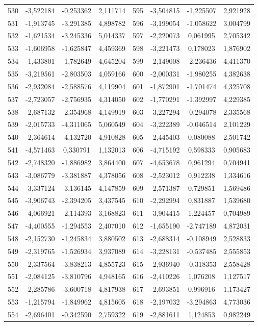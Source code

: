 \begin{apendicesenv}
\begin{table}[H]
\begin{tabular}{c c c c c c c c}
		530 & -3,522184 & -0,253362 & 2,111714 & 595 & -3,504815 & -1,225507 & 2,921928 \\
		531 & -1,913745 & -3,291385 & 4,898782 & 596 & -3,199054 & -1,058622 & 3,004799 \\
		532 & -1,621534 & -3,245336 & 5,014337 & 597 & -2,220073 & 0,061995 & 2,705342 \\
		533 & -1,606958 & -1,625847 & 4,459369 & 598 & -3,221473 & 0,178023 & 1,876902 \\
		534 & -1,433801 & -1,782649 & 4,645204 & 599 & -2,149008 & -2,236436 & 4,411370 \\
		535 & -3,219561 & -2,803503 & 4,059166 & 600 & -2,000331 & -1,980255 & 4,382638 \\
		536 & -2,932084 & -2,588576 & 4,119904 & 601 & -1,872901 & -1,701474 & 4,325708 \\
		537 & -2,723057 & -2,756935 & 4,314050 & 602 & -1,770291 & -1,392997 & 4,229385 \\
		538 & -2,687132 & -2,354968 & 4,149919 & 603 & -3,227294 & -0,294078 & 2,335568 \\
		539 & -2,015733 & -4,311065 & 5,060549 & 604 & -3,222389 & -0,046514 & 2,101229 \\
		540 & -2,364614 & -4,132720 & 4,910828 & 605 & -2,445403 & 0,080088 & 2,501742 \\
		541 & -4,571463 & 0,330791 & 1,132013 & 606 & -4,715192 & 0,598333 & 0,905683 \\
		542 & -2,748320 & -1,886982 & 3,864400 & 607 & -4,653678 & 0,961294 & 0,704941 \\
		543 & -3,086779 & -3,381887 & 4,378056 & 608 & -2,523012 & 0,912238 & 1,334616 \\
		544 & -3,337124 & -3,136145 & 4,147859 & 609 & -2,571387 & 0,729851 & 1,569486 \\
		545 & -3,906743 & -2,394205 & 3,437545 & 610 & -2,292994 & 0,831887 & 1,539680 \\
		546 & -4,066921 & -2,114393 & 3,168823 & 611 & -3,904415 & 1,224457 & 0,704989 \\
		547 & -4,400555 & -1,294553 & 2,407010 & 612 & -1,655190 & -2,747189 & 4,872031 \\
		548 & -2,152730 & -1,245834 & 3,880502 & 613 & -2,688314 & -0,108949 & 2,528833 \\
		549 & -2,319765 & -1,526934 & 3,937089 & 614 & -3,228131 & -0,537485 & 2,555853 \\
		550 & -2,337564 & -3,838213 & 4,855723 & 615 & -2,936940 & -0,318353 & 2,558428 \\
		551 & -2,084125 & -3,810796 & 4,948165 & 616 & -2,410226 & 1,076208 & 1,127517 \\
		552 & -2,285786 & -3,600718 & 4,817938 & 617 & -2,693851 & 0,996916 & 1,173427 \\
		553 & -1,215794 & -1,849962 & 4,815605 & 618 & -2,197032 & -3,294863 & 4,773036 \\
		554 & -2,696401 & -0,342590 & 2,759322 & 619 & -2,881611 & 1,124853 & 0,982249 \\
		\bottomrule
	\end{tabular}
\end{table}


\end{apendicesenv}
